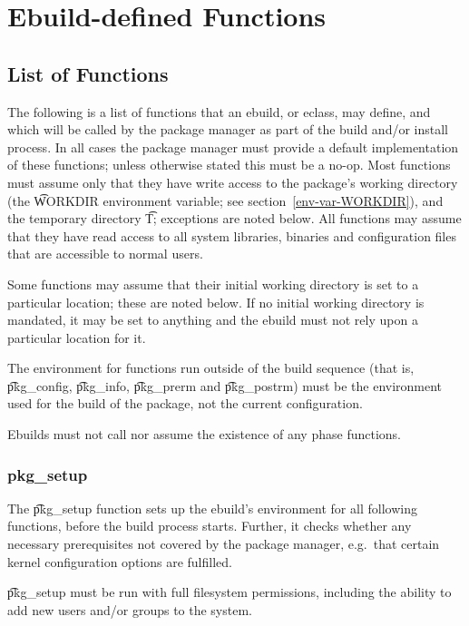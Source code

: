 \chapter{Ebuild-defined Functions}
\label{ebuild-functions}

\section{List of Functions}
\label{functions}

The following is a list of functions that an ebuild, or eclass, may define, and which will be called
by the package manager as part of the build and/or install process. In all cases the package manager
must provide a default implementation of these functions; unless otherwise stated this must be a
no-op. Most functions must assume only that they have write access to the package's working
directory (the \t{WORKDIR} environment variable; see section~\ref{env-var-WORKDIR}), and the
temporary directory \t{T}; exceptions are noted below. All functions may assume that they have read
access to all system libraries, binaries and configuration files that are accessible to normal
users.

Some functions may assume that their initial working directory is set to a particular location;
these are noted below. If no initial working directory is mandated, it may be set to anything and
the ebuild must not rely upon a particular location for it.

The environment for functions run outside of the build sequence (that is, \t{pkg\_config},
\t{pkg\_info}, \t{pkg\_prerm} and \t{pkg\_postrm}) must be the environment used for the build of the
package, not the current configuration.

Ebuilds must not call nor assume the existence of any phase functions.

\subsection{pkg\_setup}
\label{pkg-setup-function}
The \t{pkg\_setup} function sets up the ebuild's environment for all following functions, before
the build process starts. Further, it checks whether any necessary prerequisites not covered
by the package manager, e.g.\ that certain kernel configuration options are fulfilled.

\t{pkg\_setup} must be run with full filesystem permissions, including the ability to add new users
and/or groups to the system.


